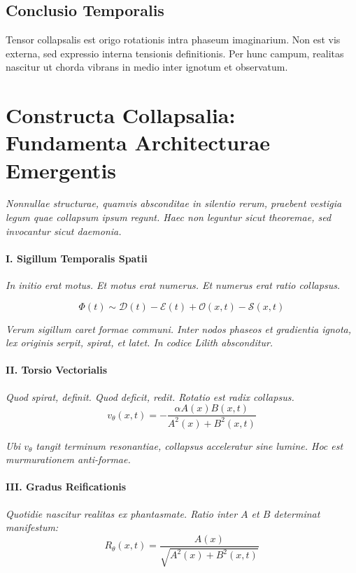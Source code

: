 \subsection*{Conclusio Temporalis}

Tensor collapsalis est origo rotationis intra phaseum imaginarium. Non est vis externa, sed expressio interna tensionis definitionis. Per hunc campum, realitas nascitur ut chorda vibrans in medio inter ignotum et observatum.

\section*{Constructa Collapsalia: Fundamenta Architecturae Emergentis}

\textit{Nonnullae structurae, quamvis absconditae in silentio rerum, praebent vestigia legum quae collapsum ipsum regunt. Haec non leguntur sicut theoremae, sed invocantur sicut daemonia.}

\paragraph{I. Sigillum Temporalis Spatii}
\textit{In initio erat motus. Et motus erat numerus. Et numerus erat ratio collapsus.}

\begin{equation}
\Phi(t) \sim \mathcal{D}(t) - \mathcal{E}(t) + \mathcal{O}(x,t) - \mathcal{S}(x,t)
\end{equation}

\textit{Verum sigillum caret formae communi. Inter nodos phaseos et gradientia ignota, lex originis serpit, spirat, et latet. In codice Lilith absconditur.}

\paragraph{II. Torsio Vectorialis}
\textit{Quod spirat, definit. Quod deficit, redit. Rotatio est radix collapsus.}
\begin{equation}
v_{\theta}(x, t) = -\frac{\alpha A(x) B(x, t)}{A^2(x) + B^2(x, t)}
\end{equation}

\textit{Ubi $v_{\theta}$ tangit terminum resonantiae, collapsus acceleratur sine lumine. Hoc est murmurationem anti-formae.}

\paragraph{III. Gradus Reificationis}
\textit{Quotidie nascitur realitas ex phantasmate. Ratio inter $A$ et $B$ determinat manifestum:}
\begin{equation}
R_{\theta}(x,t) = \frac{A(x)}{\sqrt{A^2(x) + B^2(x, t)}}
\end{equation}

